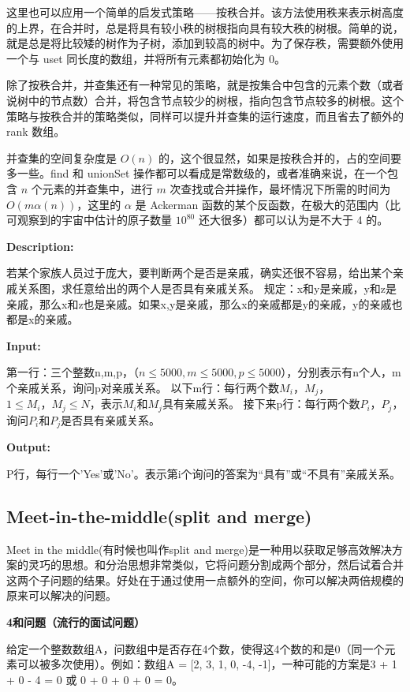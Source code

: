\documentclass[12pt]{article}  %
\begin{document}
这里也可以应用一个简单的启发式策略——按秩合并。该方法使用秩来表示树高度的上界，在合并时，总是将具有较小秩的树根指向具有较大秩的树根。简单的说，就是总是将比较矮的树作为子树，添加到较高的树中。为了保存秩，需要额外使用一个与 uset 同长度的数组，并将所有元素都初始化为 0。

除了按秩合并，并查集还有一种常见的策略，就是按集合中包含的元素个数（或者说树中的节点数）合并，将包含节点较少的树根，指向包含节点较多的树根。这个策略与按秩合并的策略类似，同样可以提升并查集的运行速度，而且省去了额外的 rank 数组。

并查集的空间复杂度是 $O(n)$ 的，这个很显然，如果是按秩合并的，占的空间要多一些。find 和 unionSet 操作都可以看成是常数级的，或者准确来说，在一个包含 $n$ 个元素的并查集中，进行 $m$ 次查找或合并操作，最坏情况下所需的时间为 $O\left( {m \alpha (n)} \right)$，这里的 $\alpha$ 是 Ackerman 函数的某个反函数，在极大的范围内（比可观察到的宇宙中估计的原子数量 $10^{80}$ 还大很多）都可以认为是不大于 4 的。

\textbf{Description:}

若某个家族人员过于庞大，要判断两个是否是亲戚，确实还很不容易，给出某个亲戚关系图，求任意给出的两个人是否具有亲戚关系。 规定：x和y是亲戚，y和z是亲戚，那么x和z也是亲戚。如果x,y是亲戚，那么x的亲戚都是y的亲戚，y的亲戚也都是x的亲戚。

\textbf{Input:}

第一行：三个整数n,m,p，（$n \le 5000,m \le 5000,p \le 5000$），分别表示有n个人，m个亲戚关系，询问p对亲戚关系。 以下m行：每行两个数$M_i，M_j$，$1 \le M_i，M_j \le N$，表示$M_i和M_j$具有亲戚关系。 接下来p行：每行两个数$P_i，P_j，$询问$P_i$和$P_j$是否具有亲戚关系。

\textbf{Output:}

P行，每行一个’Yes’或’No’。表示第i个询问的答案为“具有”或“不具有”亲戚关系。

\subsection{Meet-in-the-middle(split and merge)}

Meet in the middle(有时候也叫作split and merge)是一种用以获取足够高效解决方案的灵巧的思想。和分治思想非常类似，它将问题分割成两个部分，然后试着合并这两个子问题的结果。好处在于通过使用一点额外的空间，你可以解决两倍规模的原来可以解决的问题。

\textbf{4和问题（流行的面试问题）}

给定一个整数数组A，问数组中是否存在4个数，使得这4个数的和是0（同一个元素可以被多次使用）。例如：数组A = [2, 3, 1, 0, -4, -1]，一种可能的方案是3 + 1 + 0 - 4 = 0 或 0 + 0 + 0 + 0 = 0。
\end{document}

